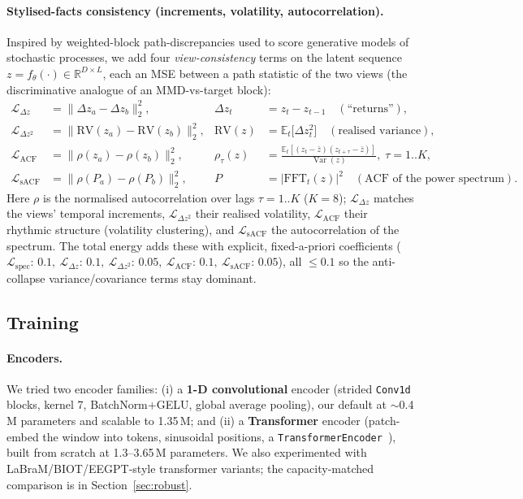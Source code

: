 \documentclass[10pt,a4paper]{article}
\begin{document}
\paragraph{Stylised-facts consistency (increments, volatility, autocorrelation).} Inspired by weighted-block
path-discrepancies used to score generative models of stochastic processes, we add four \emph{view-consistency}
terms on the latent sequence $z=f_\theta(\cdot)\in\mathbb{R}^{D\times L}$, each an MSE between a path statistic
of the two views (the discriminative analogue of an MMD-vs-target block):
\begin{align}
\mathcal{L}_{\Delta z}    &= \big\|\Delta z_a - \Delta z_b\big\|_2^2, & \Delta z_t &= z_t - z_{t-1} \quad(\text{``returns''}),\\
\mathcal{L}_{\Delta z^2}  &= \big\|\mathrm{RV}(z_a) - \mathrm{RV}(z_b)\big\|_2^2, & \mathrm{RV}(z) &= \mathbb{E}_t\!\big[\Delta z_t^2\big] \quad(\text{realised variance}),\\
\mathcal{L}_{\mathrm{ACF}}  &= \big\|\rho(z_a) - \rho(z_b)\big\|_2^2, & \rho_\tau(z) &= \frac{\mathbb{E}_t[(z_t-\bar z)(z_{t+\tau}-\bar z)]}{\operatorname{Var}(z)},\; \tau=1..K,\\
\mathcal{L}_{\mathrm{sACF}} &= \big\|\rho(P_a) - \rho(P_b)\big\|_2^2, & P &= \big|\mathrm{FFT}_t(z)\big|^2 \quad(\text{ACF of the power spectrum}).
\end{align}
Here $\rho$ is the normalised autocorrelation over lags $\tau=1..K$ ($K=8$); $\mathcal{L}_{\Delta z}$ matches
the views' temporal increments, $\mathcal{L}_{\Delta z^2}$ their realised volatility, $\mathcal{L}_{\mathrm{ACF}}$
their rhythmic structure (volatility clustering), and $\mathcal{L}_{\mathrm{sACF}}$ the autocorrelation of the
spectrum. The total energy adds these with explicit, fixed-a-priori coefficients
($\mathcal{L}_{\mathrm{spec}}{:}\,0.1,\ \mathcal{L}_{\Delta z}{:}\,0.1,\ \mathcal{L}_{\Delta z^2}{:}\,0.05,\
\mathcal{L}_{\mathrm{ACF}}{:}\,0.1,\ \mathcal{L}_{\mathrm{sACF}}{:}\,0.05$), all $\le 0.1$ so the
anti-collapse variance/covariance terms stay dominant.

\subsection{Training}
\label{sec:training}

\paragraph{Encoders.} We tried two encoder families: (i) a \textbf{1-D convolutional} encoder (strided
\texttt{Conv1d} blocks, kernel 7, BatchNorm+GELU, global average pooling), our default at $\sim$0.4\,M
parameters and scalable to 1.35\,M; and (ii) a \textbf{Transformer} encoder (patch-embed the window into
tokens, sinusoidal positions, a \texttt{TransformerEncoder}~\cite{transformer}), built from scratch at
1.3--3.65\,M parameters. We also experimented with LaBraM/BIOT/EEGPT-style transformer variants; the
capacity-matched comparison is in Section~\ref{sec:robust}.
\end{document}
